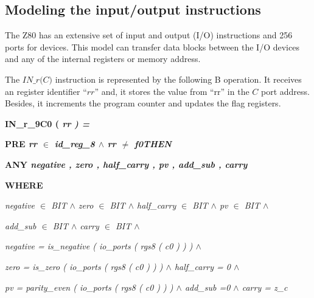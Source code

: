 \documentclass[a4paper]{llncs}
\newcommand{\footnoterecall}[1]{
  \footnotemark[\value{#1}]
}
\begin{document}
\subsection{Modeling the input/output instructions}
\label{sec:modelingIO}
The Z80 has an extensive set of input and output (I/O) instructions and 256 ports for
devices. This model can transfer data blocks between the I/O devices and any
of the internal registers or memory address.

The $\textit{IN\_r(C)}$\footnoterecall{myfootnote} instruction is represented
by the following B operation. It receives an register identifier ``$\textit{rr}$'' and, it stores the value from ``rr'' in the $\textit{C}$ port address. Besides, it increments the program counter and updates the flag registers.

\hspace*{0.0in}\bf IN\_r\_9C0 \rm ( \it rr \rm ) \rm =

\hspace*{0.0in}\bf PRE \it rr  $\in$  \it id\_reg\_8  $\land$  \it rr  $\not =$  \it f0\hspace*{0.15in}\bf THEN

\hspace*{0.20in}\bf ANY \hspace*{0.10in}\it negative \rm , \it zero \rm , \it half\_carry \rm , \it pv \rm , \it add\_sub \rm , \it carry

\hspace*{0.20in}\bf WHERE 

\hspace*{0.40in}\it negative $\in$ \it BIT $\land$ \it zero $\in$ \it BIT $\land$ \it half\_carry $\in$ \it BIT 
$\land$ \it pv $\in$ \it BIT $\land$

 \hspace*{0.40in}\it add\_sub $\in$ \it BIT $\land$ \it carry $\in$ \it BIT  $\land$

\hspace*{0.40in}\it negative \rm = \it is\_negative \rm ( \it io\_ports \rm ( \it rgs8 \rm ( \it c0 \rm ) \rm ) \rm )  $\land$ 

\hspace*{0.40in}\it zero \rm = \it is\_zero \rm ( \it io\_ports \rm ( \it rgs8 \rm ( \it c0 \rm ) \rm ) \rm )  $\land$ \it half\_carry \rm = \rm 0  $\land$ 

\hspace*{0.40in}\it pv \rm = \it parity\_even \rm ( \it io\_ports \rm ( \it rgs8 \rm ( \it c0 \rm ) \rm ) \rm ) $\land$
\it add\_sub \rm =\hspace*{0.10in}\rm 0  $\land$ 
\it carry \rm = \it z\_c
\end{document}
